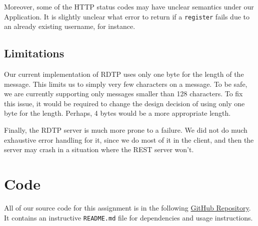 \documentclass[10pt]{article}
\begin{document}
\medskip

Moreover, some of the HTTP status codes may have unclear semantics under our Application. It is slightly
unclear what error to return if a \verb|register| fails due to an already existing username, for instance.

\subsection{Limitations}

Our current implementation of RDTP uses only one byte for the length of the message. This limits us to
simply very few characters on a message. To be safe, we are currently supporting only messages smaller than
128 characters. To fix this issue, it would be required to change the design decision of using only one byte
for the length. Perhaps, 4 bytes would be a more appropriate length.

\medskip

Finally, the RDTP server is much more prone to a failure. We did not do much exhaustive error handling for it,
since we do most of it in the client, and then the server may crash in a situation where the REST server won't.

\section{Code}

All of our source code for this assignment is in the following
\href{https://github.com/gablg1/http-sucks-chat}{GitHub Repository}.
It contains an instructive \verb|README.md| file for dependencies and usage instructions.
\end{document}
